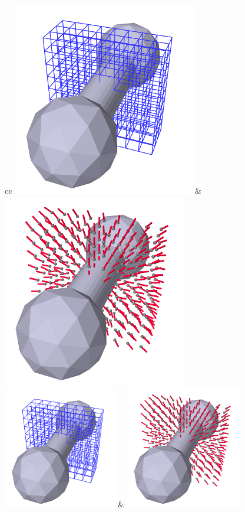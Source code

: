 \begin{figure}[ht]
\begin{center}
  \begin{tabular}{cc}
    \iflatexml
       \includegraphics[]{images/dumbbellDistanceGridSub}&
       \includegraphics[]{images/dumbbellDistanceGridGrad}
    \else
       \includegraphics[width=2in]{images/dumbbellDistanceGridSub}&
       \includegraphics[width=2in]{images/dumbbellDistanceGridGrad}

\end{tabular}
\end{center}
\end{figure}
